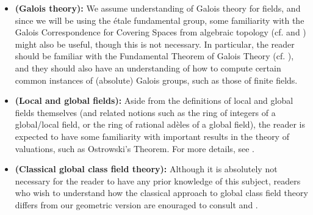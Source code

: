         \begin{convention} \label{conv: number_theory}
            \noindent
            \begin{itemize}
                \item \textbf{(Galois theory):} We assume understanding of Galois theory for fields, and since we will be using the \'etale fundamental group, some familiarity with the Galois Correspondence for Covering Spaces from algebraic topology (cf. \cite{MATH525_covering_spaces_and_fundamental_group_project} and \cite[Theorem 1.38 and Proposition 1.39]{hatcher2002algebraic}) might also be useful, though this is not necessary. In particular, the reader should be familiar with the Fundamental Theorem of Galois Theory (cf. \cite[\href{https://stacks.math.columbia.edu/tag/0BML}{Tag 0BML}]{stacks}), and they should also have an understanding of how to compute certain common instances of (absolute) Galois groups, such as those of finite fields.
                \item \textbf{(Local and global fields):} Aside from the definitions of local and global fields themselves (and related notions such as the ring of integers of a global/local field, or the ring of rational ad\`eles of a global field), the reader is expected to have some familiarity with important results in the theory of valuations, such as Ostrowski's Theorem. For more details, see \cite[Chapter II]{neukirch_2010_algebraic_number_theory}.
                \item \textbf{(Classical global class field theory):} Although it is absolutely not necessary for the reader to have any prior knowledge of this subject, readers who wish to understand how the classical approach to global class field theory differs from our geometric version are enouraged to consult \cite[Chapters IV and VI]{neukirch_2010_algebraic_number_theory} and \cite[Chapters III, VIII, and IX]{neukirch_1999_cohomology_of_number_field}.
            \end{itemize}
        \end{convention}